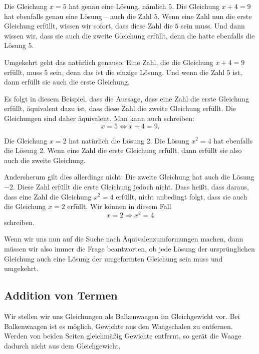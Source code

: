 \documentclass[../../main.tex]{subfiles}
\begin{document}
\begin{example}
    Die Gleichung $x=5$ hat genau eine Lösung, nämlich $5$. Die Gleichung $x+4=9$ hat ebenfalls genau eine Lösung -- auch die Zahl $5$. Wenn eine Zahl nun die erste Gleichung erfüllt, wissen wir sofort, dass diese Zahl die $5$ sein muss. Und dann wissen wir, dass sie auch die zweite Gleichung erfüllt, denn die hatte ebenfalls die Lösung $5$.
    
    Umgekehrt geht das natürlich genauso: Eine Zahl, die die Gleichung $x+4=9$ erfüllt, muss $5$ sein, denn das ist die einzige Lösung. Und wenn die Zahl $5$ ist, dann erfüllt sie auch die erste Gleichung.
    
    Es folgt in diesem Beispiel, dass die Aussage, dass eine Zahl die erste Gleichung erfüllt, äquivalent dazu ist, dass diese Zahl die zweite Gleichung erfüllt. Die Gleichungen sind daher äquivalent. Man kann auch schreiben:
    \[x=5\Leftrightarrow x+4=9.\]
\end{example}
\begin{example}
    Die Gleichung $x=2$ hat natürlich die Lösung $2$. Die Lösung $x^2=4$ hat ebenfalls die Lösung $2$. Wenn eine Zahl die erste Gleichung erfüllt, dann erfüllt sie also auch die zweite Gleichung.
    
    Andersherum gilt dies allerdings nicht: Die zweite Gleichung hat auch die Lösung $-2$. Diese Zahl erfüllt die erste Gleichung jedoch nicht. Dass heißt, dass daraus, dass eine Zahl die Gleichung $x^2=4$ erfüllt, nicht unbedingt folgt, dass sie auch die Gleichung $x=2$ erfüllt. Wir können in diesem Fall
    \[x=2\Rightarrow x^2=4\]
    schreiben.
\end{example}
Wenn wir uns nun auf die Suche nach Äquivalenzumformungen machen, dann müssen wir also immer die Frage beantworten, ob jede Lösung der ursprünglichen Gleichung auch eine Lösung der umgeformten Gleichung sein muss und umgekehrt.

\subsection{Addition von Termen}

Wir stellen wir uns Gleichungen als Balkenwaagen im Gleichgewicht vor. Bei Balkenwaagen ist es möglich, Gewichte aus den Waagschalen zu entfernen. Werden von beiden Seiten gleichmäßig Gewichte entfernt, so gerät die Waage dadurch nicht aus dem Gleichgewicht.
\end{document}
